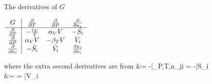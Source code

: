 \documentclass[12pt]{article}
\begin{document}
\begin{table}[ht]
  \centering
  \Large
 \caption{The derivatives of $G$}
 \renewcommand{\arraystretch}{1.5}%
 $\begin{array}{c | c c c}
 G                           & \frac{\partial}{\partial T} & \frac{\partial}{\partial P} & \frac{\partial}{\partial n_i} \\%
 \hline
 \frac{\partial}{\partial T}  & -\frac{c_P}{T}              & \alpha_V V                  & -\bar{S_i}\\%
 \frac{\partial}{\partial P}  & \alpha_V V                  & -\beta_T V                  & \bar{V_i}\\%
 \frac{\partial}{\partial n_i}& -\bar{S_i}                  & \bar{V_i}                   & \frac{\partial \mu_i}{\partial n_i}\\%
 \end{array}$
\end{table}

where the extra second derivatives are from
\eqs
{} &= -|_{P,T,n_{j\neq i}} = -\bar{S_i}\\
 &= = \bar{V_i}
\eqe
\end{document}
